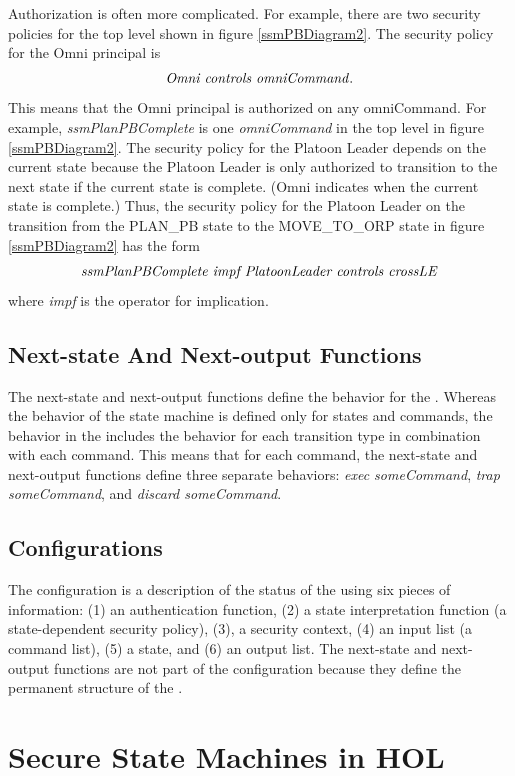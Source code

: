 \documentclass[../../main/main.tex]{subfiles}
\begin{document}
Authorization is often more complicated.  For example, there are two security policies for the top level  shown in figure \ref{ssmPBDiagram2}.  The security policy for the Omni principal is
\[\text{\textit{Omni controls omniCommand}}.\]  This means that the Omni principal is authorized on any omniCommand.  For example, \textit{ssmPlanPBComplete} is one \textit{omniCommand} in the top level  in figure \ref{ssmPBDiagram2}.  The security policy for the Platoon Leader depends on the current state because the Platoon Leader is only authorized to transition to the next state if the current state is complete.  (Omni indicates when the current state is complete.)  Thus, the security policy for the Platoon Leader on the transition from the PLAN_PB state to the MOVE_TO_ORP state in figure \ref{ssmPBDiagram2} has the form \[\text{\textit{ssmPlanPBComplete impf PlatoonLeader controls crossLE}}\]where \textit{impf} is the  operator for implication.

\subsection{Next-state And Next-output Functions}
The next-state and next-output functions define the behavior for the .  Whereas the behavior of the state machine is defined only for states and commands, the behavior in the  includes the behavior for each transition type in combination with each command.  This means that for each command, the next-state and next-output functions define three separate behaviors: \textit{exec someCommand}, \textit{trap someCommand}, and \textit{discard someCommand}.  

\subsection{Configurations}
The configuration is a description of the status of the  using six pieces of information: (1) an authentication function, (2) a state interpretation function (a state-dependent security policy), (3), a security context, (4) an input list (a command list), (5) a state, and (6) an output list.   The next-state and next-output functions are not part of the configuration because they define the permanent structure of the .


\section{Secure State Machines in HOL}\label{sec:sminHOL}
\end{document}
